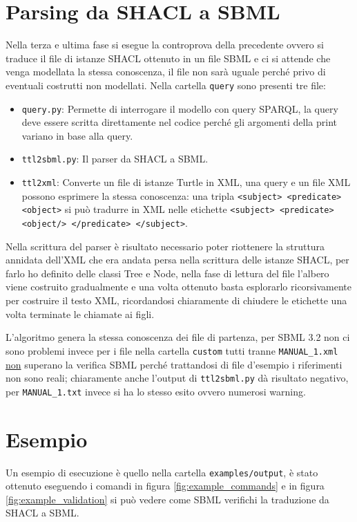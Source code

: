 \documentclass{article}
\begin{document}
\section{Parsing da SHACL a SBML}
Nella terza e ultima fase si esegue la controprova della precedente ovvero si traduce il file di istanze SHACL ottenuto in un file SBML e ci si attende che venga modellata la stessa conoscenza, il file non sarà uguale perché privo di eventuali costrutti non modellati. Nella cartella \texttt{query} sono presenti tre file:

\begin{itemize}
    \item \texttt{query.py}: Permette di interrogare il modello con query SPARQL, la query deve essere scritta direttamente nel codice perché gli argomenti della print variano in base alla query.
    \item \texttt{ttl2sbml.py}: Il parser da SHACL a SBML.
    \item \texttt{ttl2xml}: Converte un file di istanze Turtle in XML, una query e un file XML possono esprimere la stessa conoscenza: una tripla \texttt{<subject> <predicate> <object>} si può tradurre in XML nelle etichette \texttt{<subject> <predicate> <object/> </predicate> </subject>}.
\end{itemize}

Nella scrittura del parser è risultato necessario poter riottenere la struttura annidata dell'XML che era andata persa nella scrittura delle istanze SHACL, per farlo ho definito delle classi Tree e Node, nella fase di lettura del file l'albero viene costruito gradualmente e una volta ottenuto basta esplorarlo ricorsivamente per costruire il testo XML, ricordandosi chiaramente di chiudere le etichette una volta terminate le chiamate ai figli. 

L'algoritmo genera la stessa conoscenza dei file di partenza, per SBML 3.2 non ci sono problemi invece per i file nella cartella \texttt{custom} tutti tranne \texttt{MANUAL\_1.xml} \underline{non} superano la verifica SBML perché trattandosi di file d'esempio i riferimenti non sono reali; chiaramente anche l'output di \texttt{ttl2sbml.py} dà risultato negativo, per \texttt{MANUAL\_1.txt} invece si ha lo stesso esito ovvero numerosi warning.

\section{Esempio}
Un esempio di esecuzione è quello nella cartella \texttt{examples/output}, è stato ottenuto eseguendo i comandi in figura \ref{fig:example_commands} e in figura \ref{fig:example_validation} si può vedere come SBML verifichi la traduzione da SHACL a SBML.
\end{document}
